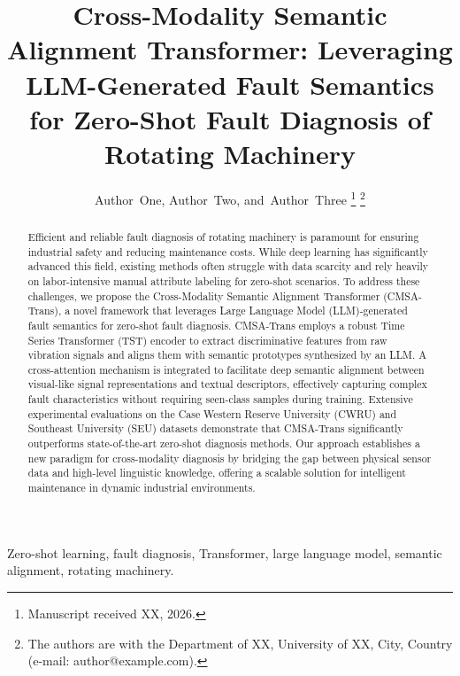 \documentclass[journal]{IEEEtran}
\begin{document}
\title{Cross-Modality Semantic Alignment Transformer: Leveraging LLM-Generated Fault Semantics for Zero-Shot Fault Diagnosis of Rotating Machinery}

\author{Author~One,
        Author~Two,
        and~Author~Three
\thanks{Manuscript received XX, 2026.}
\thanks{The authors are with the Department of XX, University of XX, City, Country (e-mail: author@example.com).}}


\maketitle

\begin{abstract}
Efficient and reliable fault diagnosis of rotating machinery is paramount for ensuring industrial safety and reducing maintenance costs. While deep learning has significantly advanced this field, existing methods often struggle with data scarcity and rely heavily on labor-intensive manual attribute labeling for zero-shot scenarios. To address these challenges, we propose the Cross-Modality Semantic Alignment Transformer (CMSA-Trans), a novel framework that leverages Large Language Model (LLM)-generated fault semantics for zero-shot fault diagnosis. CMSA-Trans employs a robust Time Series Transformer (TST) encoder to extract discriminative features from raw vibration signals and aligns them with semantic prototypes synthesized by an LLM. A cross-attention mechanism is integrated to facilitate deep semantic alignment between visual-like signal representations and textual descriptors, effectively capturing complex fault characteristics without requiring seen-class samples during training. Extensive experimental evaluations on the Case Western Reserve University (CWRU) and Southeast University (SEU) datasets demonstrate that CMSA-Trans significantly outperforms state-of-the-art zero-shot diagnosis methods. Our approach establishes a new paradigm for cross-modality diagnosis by bridging the gap between physical sensor data and high-level linguistic knowledge, offering a scalable solution for intelligent maintenance in dynamic industrial environments.
\end{abstract}

\begin{IEEEkeywords}
Zero-shot learning, fault diagnosis, Transformer, large language model, semantic alignment, rotating machinery.
\end{IEEEkeywords}
\end{document}
